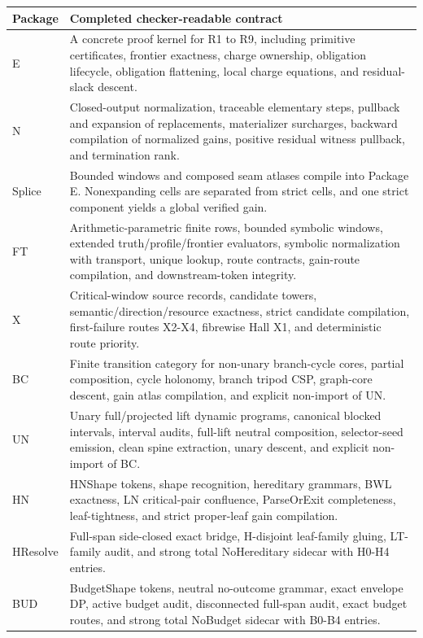 \documentclass[10.5pt,a4paper]{article}
\begin{document}
\begin{longtable}{>{\raggedright\arraybackslash}p{}p{}}
\toprule
Package & Completed checker-readable contract\\
\midrule
E & A concrete proof kernel for R1 to R9, including primitive certificates, frontier exactness, charge ownership, obligation lifecycle, obligation flattening, local charge equations, and residual-slack descent.\\
N & Closed-output normalization, traceable elementary steps, pullback and expansion of replacements, materializer surcharges, backward compilation of normalized gains, positive residual witness pullback, and termination rank.\\
Splice & Bounded windows and composed seam atlases compile into Package E.  Nonexpanding cells are separated from strict cells, and one strict component yields a global verified gain.\\
FT & Arithmetic-parametric finite rows, bounded symbolic windows, extended truth/profile/frontier evaluators, symbolic normalization with transport, unique lookup, route contracts, gain-route compilation, and downstream-token integrity.\\
X & Critical-window source records, candidate towers, semantic/direction/resource exactness, strict candidate compilation, first-failure routes X2-X4, fibrewise Hall X1, and deterministic route priority.\\
BC & Finite transition category for non-unary branch-cycle cores, partial composition, cycle holonomy, branch tripod CSP, graph-core descent, gain atlas compilation, and explicit non-import of UN.\\
UN & Unary full/projected lift dynamic programs, canonical blocked intervals, interval audits, full-lift neutral composition, selector-seed emission, clean spine extraction, unary descent, and explicit non-import of BC.\\
HN & HNShape tokens, shape recognition, hereditary grammars, BWL exactness, LN critical-pair confluence, ParseOrExit completeness, leaf-tightness, and strict proper-leaf gain compilation.\\
HResolve & Full-span side-closed exact bridge, H-disjoint leaf-family gluing, LT-family audit, and strong total NoHereditary sidecar with H0-H4 entries.\\
BUD & BudgetShape tokens, neutral no-outcome grammar, exact envelope DP, active budget audit, disconnected full-span audit, exact budget routes, and strong total NoBudget sidecar with B0-B4 entries.\\

\end{longtable}
\end{document}

